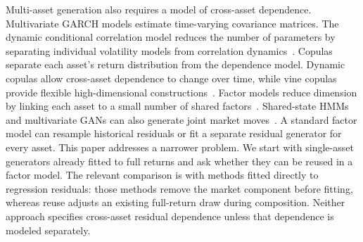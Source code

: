 Multi-asset generation also requires a model of cross-asset dependence.
Multivariate GARCH models estimate time-varying covariance matrices. The
dynamic conditional correlation model reduces the number of parameters by
separating individual volatility models from correlation
dynamics~\cite{engle2002dcc,bauwensLaurentRombouts2006}. Copulas separate each
asset's return distribution from the dependence model. Dynamic copulas allow
cross-asset dependence to change over time, while vine copulas provide flexible
high-dimensional constructions~\cite{patton2006,
aasCzadoFrigessiBakken2009}. Factor models reduce dimension by linking each
asset to a small number of shared
factors~\cite{sharpe1963,rossAPT1976,famaFrench1993}. Shared-state HMMs and
multivariate GANs can also generate joint market
moves~\cite{diasVermuntRamos2010,rizzatoEtAl2023}. A standard factor model can
resample historical residuals or fit a separate residual generator for every
asset. This paper addresses a narrower problem. We start with single-asset
generators already fitted to full returns and ask whether they can be reused in
a factor model.
The relevant comparison is with methods fitted directly to regression
residuals: those methods remove the market component before fitting,
whereas reuse adjusts an existing full-return draw during composition.
Neither approach specifies cross-asset residual dependence unless that
dependence is modeled separately.
